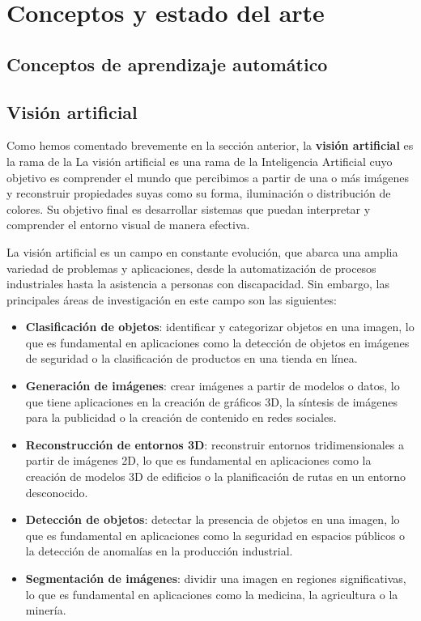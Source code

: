 
\chapter{Conceptos y estado del arte}

\section{Conceptos de aprendizaje automático}


\section{Visión artificial}

Como hemos comentado brevemente en la sección anterior, la \textbf{visión artificial} es la rama de la La visión artificial es una rama de la Inteligencia Artificial cuyo objetivo es comprender el mundo que percibimos a partir de una o más imágenes y reconstruir propiedades suyas como su forma, iluminación o distribución de colores. Su objetivo final es desarrollar sistemas que puedan interpretar y comprender el entorno visual de manera efectiva.

La visión artificial es un campo en constante evolución, que abarca una amplia variedad de problemas y aplicaciones, desde la automatización de procesos industriales hasta la asistencia a personas con discapacidad. Sin embargo, las principales áreas de investigación en este campo son las siguientes:

\begin{itemize} 
	\item \textbf{Clasificación de objetos}: identificar y categorizar objetos en una imagen, lo que es fundamental en aplicaciones como la detección de objetos en imágenes de seguridad o la clasificación de productos en una tienda en línea. 
	\item \textbf{Generación de imágenes}: crear imágenes a partir de modelos o datos, lo que tiene aplicaciones en la creación de gráficos 3D, la síntesis de imágenes para la publicidad o la creación de contenido en redes sociales. 
	\item \textbf{Reconstrucción de entornos 3D}: reconstruir entornos tridimensionales a partir de imágenes 2D, lo que es fundamental en aplicaciones como la creación de modelos 3D de edificios o la planificación de rutas en un entorno desconocido. 
	\item \textbf{Detección de objetos}: detectar la presencia de objetos en una imagen, lo que es fundamental en aplicaciones como la seguridad en espacios públicos o la detección de anomalías en la producción industrial. 
	\item \textbf{Segmentación de imágenes}: dividir una imagen en regiones significativas, lo que es fundamental en aplicaciones como la medicina, la agricultura o la minería. 
\end{itemize}

